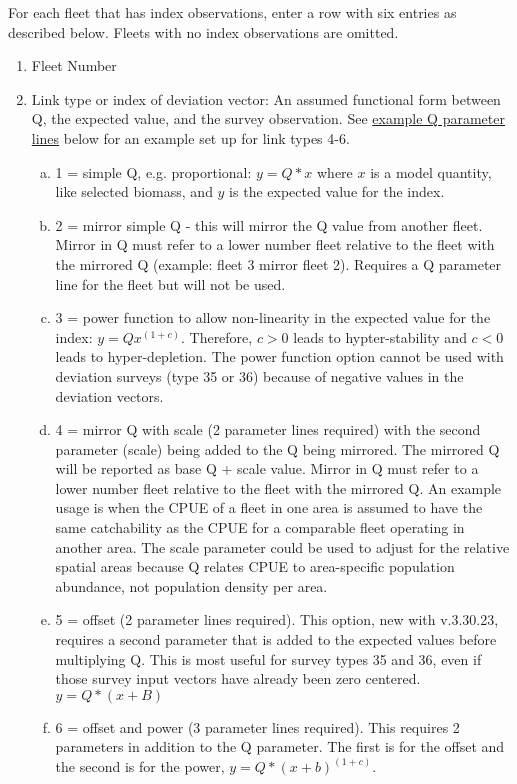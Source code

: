 For each fleet that has index observations, enter a row with six entries as described below. Fleets with no index observations are omitted.

\begin{enumerate}
	\item Fleet Number
	\item Link type or index of deviation vector: An assumed functional form between Q, the expected value, and the survey observation. See \hyperlink{QParam}{example Q parameter lines} below for an example set up for link types 4-6.
	\begin{enumerate}[(a)]
		\item 1 = simple Q, e.g. proportional: $y=Q*x$ where $x$ is a model quantity, like selected biomass, and $y$ is the expected value for the index.
		\item 2 = mirror simple Q - this will mirror the Q value from another fleet. Mirror in Q must refer to a lower number fleet relative to the fleet with the mirrored Q (example: fleet 3 mirror fleet 2). Requires a Q parameter line for the fleet but will not be used.
		\item 3 = power function to allow non-linearity in the expected value for the index: $y=Qx^{(1+c)}$. Therefore, $c > 0$ leads to hypter-stability and $c < 0$ leads to hyper-depletion. The power function option cannot be used with deviation surveys (type 35 or 36) because of negative values in the deviation vectors.
		\item 4 = mirror Q with scale (2 parameter lines required) with the second parameter (scale) being added to the Q being mirrored. The mirrored Q will be reported as base Q + scale value. Mirror in Q must refer to a lower number fleet relative to the fleet with the mirrored Q. An example usage is when the CPUE of a fleet in one area is assumed to have the same catchability as the CPUE for a comparable fleet operating in another area. The scale parameter could be used to adjust for the relative spatial areas because Q relates CPUE to area-specific population abundance, not population density per area.
		\item 5 = offset (2 parameter lines required). This option, new with v.3.30.23, requires a second parameter that is added to the expected values before multiplying Q. This is most useful for survey types 35 and 36, even if those survey input vectors have already been zero centered. $y=Q*(x+B)$
		\item 6 = offset and power (3 parameter lines required). This requires 2 parameters in addition to the Q parameter. The first is for the offset and the second is for the power, $y=Q*(x+b)^{(1+c)}$.

\end{enumerate}
\end{enumerate}
